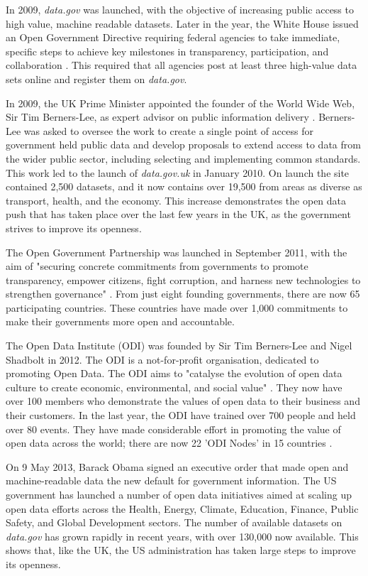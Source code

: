 \documentclass[authoryearcitations]{UoYCSproject}
\begin{document}
In 2009, \textit{data.gov} was launched, with the objective of increasing public access to high value, machine readable datasets. Later in the year, the White House issued an Open Government Directive requiring federal agencies to take immediate, specific steps to achieve key milestones in transparency, participation, and collaboration \citep{Orszag2009}. This required that all agencies post at least three high-value data sets online and register them on \textit{data.gov}.

In 2009, the UK Prime Minister appointed the founder of the World Wide Web, Sir Tim Berners-Lee, as expert advisor on public information delivery \citep{CabinetOffice2009}. Berners-Lee was asked to oversee the work to create a single point of access for government held public data and develop proposals to extend access to data from the wider public sector, including selecting and implementing common standards. This work led to the launch of \textit{data.gov.uk} in January 2010. On launch the site contained 2,500 datasets, and it now contains over 19,500 from areas as diverse as transport, health, and the economy. This increase demonstrates the open data push that has taken place over the last few years in the UK, as the government strives to improve its openness.

The Open Government Partnership was launched in September 2011, with the aim of "securing concrete commitments from governments to promote transparency, empower citizens, fight corruption, and harness new technologies to strengthen governance" \citep{OpenGovernmentPartnership}. From just eight founding governments, there are now 65 participating countries. These countries have made over 1,000 commitments to make their governments more open and accountable.

The Open Data Institute (ODI) was founded by Sir Tim Berners-Lee and Nigel Shadbolt in 2012. The ODI is a not-for-profit organisation, dedicated to promoting Open Data. The ODI aims to "catalyse the evolution of open data culture to create economic, environmental, and social value" \citep{TheOpenDataInstitute}. They now have over 100 members who demonstrate the values of open data to their business and their customers. In the last year, the ODI have trained over 700 people and held over 80 events. They have made considerable effort in promoting the value of open data across the world; there are now 22 'ODI Nodes' in 15 countries \citep{TheOpenDataInstitute2015a}.

On 9 May 2013, Barack Obama signed an executive order \citep{TheWhiteHouse-OfficeofthePressSecretary2013} that made open and machine-readable data the new default for government information. The US government has launched a number of open data initiatives aimed at scaling up open data efforts across the Health, Energy, Climate, Education, Finance, Public Safety, and Global Development sectors. The number of available datasets on \textit{data.gov} has grown rapidly in recent years, with over 130,000 now available. This shows that, like the UK, the US administration has taken large steps to improve its openness.
\end{document}

